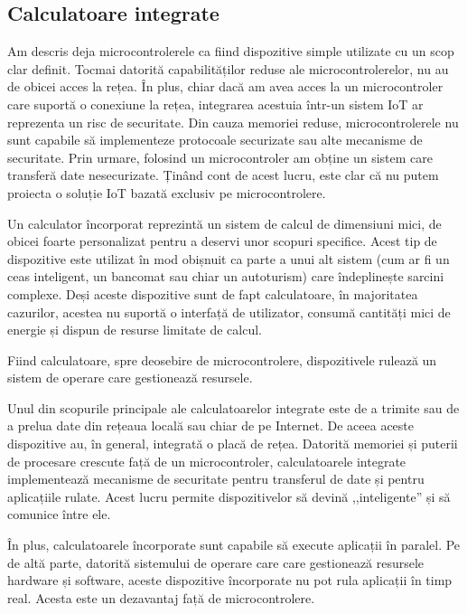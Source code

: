\subsection{Calculatoare integrate}
\label{sec:embed:micro-comp:embed}

Am descris deja microcontrolerele ca fiind dispozitive simple utilizate cu un
scop clar definit. Tocmai datorită capabilităților reduse ale microcontrolerelor,
nu au de obicei acces la rețea. În plus, chiar dacă am avea acces la un
microcontroler care suportă o conexiune la rețea, integrarea acestuia într-un
sistem IoT ar reprezenta un risc de securitate. Din cauza memoriei reduse,
microcontrolerele nu sunt capabile să implementeze protocoale securizate sau
alte mecanisme de securitate. Prin urmare, folosind un microcontroler am obține
un sistem care transferă date nesecurizate. Ținând cont de acest lucru, este
clar că nu putem proiecta o soluție IoT bazată exclusiv pe microcontrolere.

Un calculator încorporat reprezintă un sistem de calcul de dimensiuni mici, de
obicei foarte personalizat pentru a deservi unor scopuri specifice. Acest tip de
dispozitive este utilizat în mod obișnuit ca parte a unui alt sistem (cum ar fi
un ceas inteligent, un bancomat sau chiar un autoturism) care îndeplinește
sarcini complexe. Deși aceste dispozitive sunt de fapt calculatoare, în
majoritatea cazurilor, acestea nu suportă o interfață de utilizator, consumă
cantități mici de energie și dispun de resurse limitate de calcul.

Fiind calculatoare, spre deosebire de microcontrolere, dispozitivele rulează un
sistem de operare care gestionează resursele.

Unul din scopurile principale ale calculatoarelor integrate este de a trimite
sau de a prelua date din rețeaua locală sau chiar de pe Internet. De aceea
aceste dispozitive au, în general, integrată o placă de rețea. Datorită memoriei
și puterii de procesare crescute față de un microcontroler, calculatoarele
integrate implementează mecanisme de securitate pentru transferul
de date și pentru aplicațiile rulate. Acest lucru permite dispozitivelor să
devină ,,inteligente'' și să comunice între ele.

În plus, calculatoarele încorporate sunt capabile să execute aplicații în
paralel. Pe de altă parte, datorită sistemului de operare care care gestionează
resursele hardware și software, aceste dispozitive încorporate nu pot rula
aplicații în timp real. Acesta este un dezavantaj față de microcontrolere.

